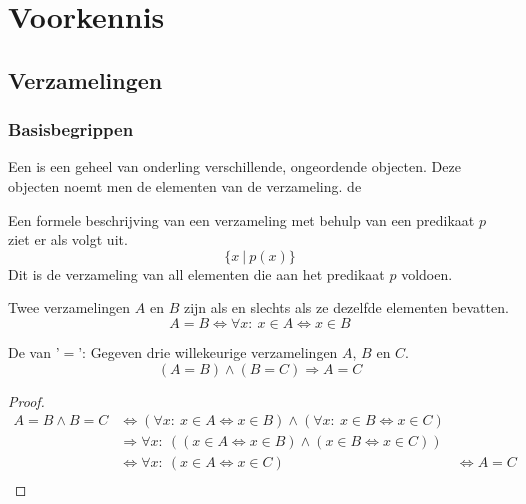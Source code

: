 \documentclass[main.tex]{subfiles}
\begin{document}
\chapter{Voorkennis}
\label{cha:voorkennis}


\section{Verzamelingen}
\label{sec:verzamelingen}

\subsection{Basisbegrippen}
\label{sec:basisbegrippen}

\begin{de}
  Een  is een geheel van onderling verschillende, ongeordende objecten. Deze objecten noemt men de elementen van de verzameling.
de 
\end{de}

\begin{de}
  Een formele beschrijving van een verzameling met behulp van een predikaat $p$ ziet er als volgt uit.
  \[ \{x\ |\ p(x)\} \]
  Dit is de verzameling van all elementen die aan het predikaat $p$ voldoen.
\end{de}

\begin{de}
  Twee verzamelingen $A$ en $B$ zijn  als en slechts als ze dezelfde elementen bevatten. 
  \[ A = B \Leftrightarrow \forall x:\ x \in A \Leftrightarrow x \in B \]
\end{de}

\begin{st}
  De  van '$=$': Gegeven drie willekeurige verzamelingen $A$, $B$ en $C$.
  \[ (A = B) \wedge (B = C) \Rightarrow A = C \]
  \begin{proof}
    \[
    \begin{array}{cll}
      A = B \wedge B = C &\Leftrightarrow (\forall x:\ x \in A \Leftrightarrow x \in B) \wedge (\forall x:\ x \in B \Leftrightarrow x \in C) &\\
      &\Rightarrow \forall x:\ ((x \in A \Leftrightarrow x \in B) \wedge (x \in B \Leftrightarrow x \in C)) &\\
      &\Leftrightarrow \forall x:\ (x \in A \Leftrightarrow x \in C) &\Leftrightarrow  A = C\\
    \end{array}
    \]
  \end{proof}
\end{st}
\end{document}
